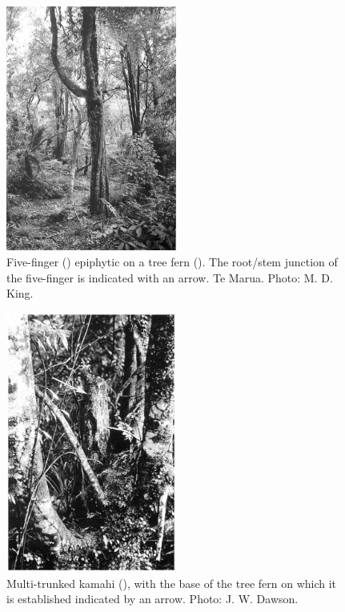 \begin{figure}
	\includegraphics[width=0.5\textwidth]{graphics/figure55fivefinger.jpg}
	\centering
	\caption[Five-finger epiphytic on a tree fern]{Five-finger () epiphytic on a tree fern (). The root/stem junction of the five-finger is indicated with an arrow. Te Marua. Photo:  M. D. King.}%
	\label{fig:55fivefinger}
\end{figure}

\begin{figure}
	\includegraphics[width=0.5\textwidth]{graphics/figure56kamahi.jpg}
	\centering
	\caption[Multi-trunked kamahi]{Multi-trunked kamahi (), with the base of the tree fern on which it is established indicated by an arrow.
	Photo: J. W. Dawson.}%
	\label{fig:56kamahi}
\end{figure}


